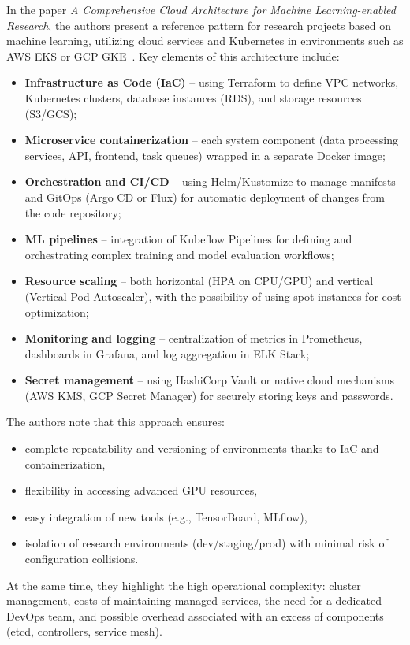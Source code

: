 In the paper \textit{A Comprehensive Cloud Architecture for Machine Learning-enabled Research}, the authors present a reference pattern for research projects based on machine learning, utilizing cloud services and Kubernetes in environments such as AWS EKS or GCP GKE~\cite{cloud_architecture_for_research}.
Key elements of this architecture include:
\begin{itemize}
    \item \textbf{Infrastructure as Code (IaC)} – using Terraform to define VPC networks, Kubernetes clusters, database instances (RDS), and storage resources (S3/GCS);
    \item \textbf{Microservice containerization} – each system component (data processing services, API, frontend, task queues) wrapped in a separate Docker image;
    \item \textbf{Orchestration and CI/CD} – using Helm/Kustomize to manage manifests and GitOps (Argo CD or Flux) for automatic deployment of changes from the code repository;
    \item \textbf{ML pipelines} – integration of Kubeflow Pipelines for defining and orchestrating complex training and model evaluation workflows;
    \item \textbf{Resource scaling} – both horizontal (HPA on CPU/GPU) and vertical (Vertical Pod Autoscaler), with the possibility of using spot instances for cost optimization;
    \item \textbf{Monitoring and logging} – centralization of metrics in Prometheus, dashboards in Grafana, and log aggregation in ELK Stack;
    \item \textbf{Secret management} – using HashiCorp Vault or native cloud mechanisms (AWS KMS, GCP Secret Manager) for securely storing keys and passwords.
\end{itemize}
The authors note that this approach ensures:
\begin{itemize}
    \item complete repeatability and versioning of environments thanks to IaC and containerization,
    \item flexibility in accessing advanced GPU resources,
    \item easy integration of new tools (e.g., TensorBoard, MLflow),
    \item isolation of research environments (dev/staging/prod) with minimal risk of configuration collisions.
\end{itemize}
At the same time, they highlight the high operational complexity: cluster management, costs of maintaining managed services, the need for a dedicated DevOps team, and possible overhead associated with an excess of components (etcd, controllers, service mesh).

